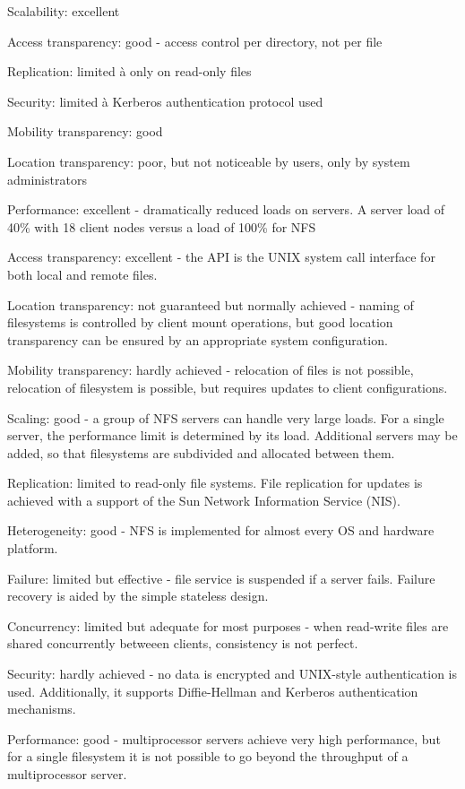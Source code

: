 
 Scalability: excellent

 Access transparency: good - access control per directory, not per
ﬁle

 Replication: limited à only on read-only ﬁles

 Security: limited à Kerberos authentication protocol used

 Mobility transparency: good

 Location transparency: poor, but not noticeable by users, only by
system administrators

Performance: excellent - dramatically reduced loads on servers. A
server load of 40\% with 18 client nodes versus a load of 100\% for
NFS

Access transparency: excellent - the API is the UNIX system call
interface for both local and remote ﬁles.

Location transparency: not guaranteed but normally achieved -
naming of ﬁlesystems is controlled by client mount operations, but
good location transparency can be ensured by an appropriate
system conﬁguration.

 Mobility transparency: hardly achieved - relocation of ﬁles is not
possible, relocation of ﬁlesystem is possible, but requires updates
to client conﬁgurations.

 Scaling: good - a group of NFS servers can handle very large loads.
For a single server, the performance limit is determined by its load.
Additional servers may be added, so that ﬁlesystems are
subdivided and allocated between them.

 Replication: limited to read-only ﬁle systems. File replication for
updates is achieved with a support of the Sun Network
Information Service (NIS).

 Heterogeneity: good - NFS is implemented for almost every OS
and hardware platform.

 Failure: limited but eﬀective - ﬁle service is suspended if a server
fails. Failure recovery is aided by the simple stateless design.

 Concurrency: limited but adequate for most purposes - when
read-write ﬁles are shared concurrently betweeen clients,
consistency is not perfect.

 Security: hardly achieved - no data is encrypted and UNIX-style
authentication is used. Additionally, it supports Diﬃe-Hellman
and Kerberos authentication mechanisms.

 Performance: good - multiprocessor servers achieve very high
performance, but for a single ﬁlesystem it is not possible to go
beyond the throughput of a multiprocessor server.
